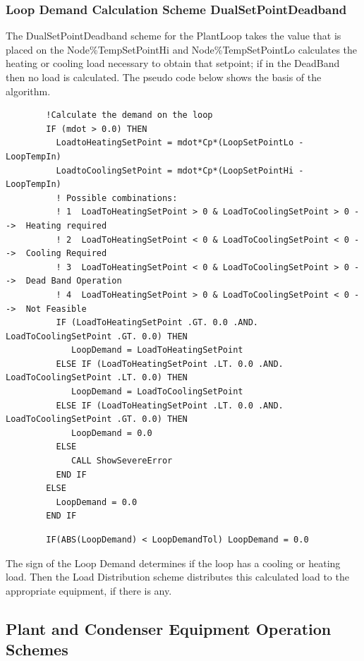 \subsubsection{Loop Demand Calculation Scheme DualSetPointDeadband}\label{loop-demand-calculation-scheme-dualsetpointdeadband}

The DualSetPointDeadband scheme for the PlantLoop takes the value that is placed on the Node\%TempSetPointHi and Node\%TempSetPointLo calculates the heating or cooling load necessary to obtain that setpoint; if in the DeadBand then no load is calculated. The pseudo code below shows the basis of the algorithm.

\begin{lstlisting}
        !Calculate the demand on the loop
        IF (mdot > 0.0) THEN
          LoadtoHeatingSetPoint = mdot*Cp*(LoopSetPointLo - LoopTempIn)
          LoadtoCoolingSetPoint = mdot*Cp*(LoopSetPointHi - LoopTempIn)
          ! Possible combinations:
          ! 1  LoadToHeatingSetPoint > 0 & LoadToCoolingSetPoint > 0 -->  Heating required
          ! 2  LoadToHeatingSetPoint < 0 & LoadToCoolingSetPoint < 0 -->  Cooling Required
          ! 3  LoadToHeatingSetPoint < 0 & LoadToCoolingSetPoint > 0 -->  Dead Band Operation
          ! 4  LoadToHeatingSetPoint > 0 & LoadToCoolingSetPoint < 0 -->  Not Feasible
          IF (LoadToHeatingSetPoint .GT. 0.0 .AND. LoadToCoolingSetPoint .GT. 0.0) THEN
             LoopDemand = LoadToHeatingSetPoint
          ELSE IF (LoadToHeatingSetPoint .LT. 0.0 .AND. LoadToCoolingSetPoint .LT. 0.0) THEN
             LoopDemand = LoadToCoolingSetPoint
          ELSE IF (LoadToHeatingSetPoint .LT. 0.0 .AND. LoadToCoolingSetPoint .GT. 0.0) THEN
             LoopDemand = 0.0
          ELSE
             CALL ShowSevereError
          END IF
        ELSE
          LoopDemand = 0.0
        END IF
\end{lstlisting}

\begin{lstlisting}
        IF(ABS(LoopDemand) < LoopDemandTol) LoopDemand = 0.0
\end{lstlisting}

The sign of the Loop Demand determines if the loop has a cooling or heating load. Then the Load Distribution scheme distributes this calculated load to the appropriate equipment, if there is any.

\subsection{Plant and Condenser Equipment Operation Schemes}\label{plant-and-condenser-equipment-operation-schemes}

